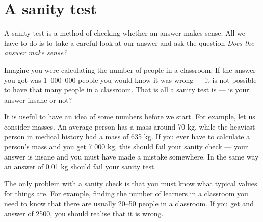     \section{A sanity test}
            \nopagebreak
      \label{m30853*id67594}A sanity test is a method of checking whether an answer makes sense. All we have to do is to take a careful look at our answer and ask the question \textsl{Does the answer make sense?}\par 
      \label{m30853*id67603}Imagine you were calculating the number of people in a classroom. If the answer you got was 1~000~000 people you would know it was wrong --- it is not possible to have that many people in a classroom. That is all a sanity test is --- is your answer insane or not?\par 
      \label{m30853*id67610}It is useful to have an idea of some numbers before we start. For example, let us consider masses. An average person has a mass around 70 kg, while the heaviest person in medical history had a mass of 635 kg. If you ever have to calculate a person's mass and you get 7 000 kg, this should fail your sanity check --- your answer is insane and you must have made a mistake somewhere. In the same way an answer of 0.01 kg should fail your sanity test.\par 
      \label{m30853*id67621}The only problem with a sanity check is that you must know what typical values for things are. For example, finding the number of learners in a classroom you need to know that there are usually 20--50 people in a classroom. If you get and answer of 2500, you should realise that it is wrong.\par 
\label{m30853*secfhsst!!!underscore!!!id1148}
